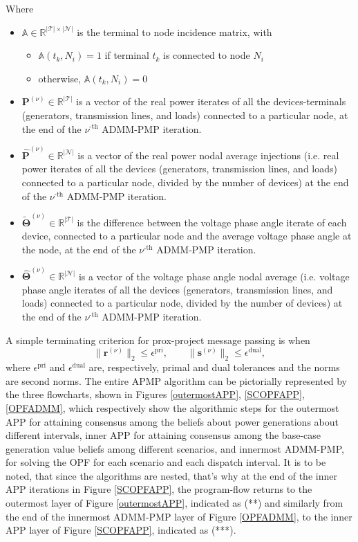 \documentclass[preprint,12pt,3p]{elsarticle}
\begin{document}
	Where \begin{itemize}
		\item $\mathbb{A}\in\mathbb{R}^{|\mathcal{T}|\times|\mathcal{N}|}$ is the terminal to node incidence matrix, with 
		\begin{itemize}
			\item $\mathbb{A}(t_k,N_i)=1$ if terminal $t_k$ is connected to node $N_i$
			\item otherwise, $\mathbb{A}(t_k,N_i)=0$
		\end{itemize}
		\item ${\mathbf{P}}^{(\nu)}\in\mathbb{R}^{|\mathcal{T}|}$ is a vector of the real power iterates of all the devices-terminals (generators, transmission lines, and loads) connected to a particular node, at the end of the $\nu^{\text{-th}}$ ADMM-PMP iteration.
		\item ${\hat{\mathbf{P}}}^{(\nu)}\in\mathbb{R}^{|\mathcal{N}|}$ is a vector of the real power nodal average injections (i.e. real power iterates of all the devices (generators, transmission lines, and loads) connected to a particular node, divided by the number of devices) at the end of the $\nu^{\text{-th}}$ ADMM-PMP iteration.
		\item $\tilde{\mathbf{\Theta}}^{(\nu)}\in\mathbb{R}^{|\mathcal{T}|}$ is the difference between the voltage phase angle iterate of each device, connected to a particular node and the average voltage phase angle at the node, at the end of the $\nu^{\text{-th}}$ ADMM-PMP iteration.
		\item ${\hat{\mathbf{\Theta}}}^{(\nu)}\in\mathbb{R}^{|\mathcal{N}|}$ is a vector of the voltage phase angle nodal average (i.e. voltage phase angle iterates of all the devices (generators, transmission lines, and loads) connected to a particular node, divided by the number of devices) at the end of the $\nu^{\text{-th}}$ ADMM-PMP iteration.
	\end{itemize}
	A simple terminating criterion for prox-project message passing is when
	\[
	\| {\mathbf{r}}^{(\nu)} \|_2 \leq \epsilon^\mathrm{pri}, \qquad \|{\mathbf{s}}^{(\nu)}\|_2 \leq \epsilon^\mathrm{dual},
	\]
	where $\epsilon^\mathrm{pri}$ and $\epsilon^\mathrm{dual}$ are,
	respectively, primal and dual tolerances and the norms are second norms. The entire APMP algorithm can be pictorially represented by the three flowcharts, shown in Figures \ref{outermostAPP}, \ref{SCOPFAPP}, \ref{OPFADMM}, which respectively show the algorithmic steps for the outermost APP for attaining consensus among the beliefs about power generations about different intervals, inner APP for attaining consensus among the base-case generation value beliefs among different scenarios, and innermost ADMM-PMP, for solving the OPF for each scenario and each dispatch interval. It is to be noted, that since the algorithms are nested, that's why at the end of the inner APP iterations in Figure \ref{SCOPFAPP}, the program-flow returns to the outermost layer of Figure \ref{outermostAPP}, indicated as (**) and similarly from the end of the innermost ADMM-PMP layer of Figure \ref{OPFADMM}, to the inner APP layer of Figure \ref{SCOPFAPP}, indicated as (***).
\end{document}
